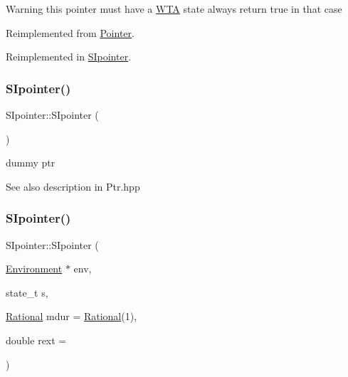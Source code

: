 \begin{DoxyWarning}{Warning}
this pointer must have a \mbox{\hyperlink{classWTA}{W\+TA}} state always return true in that case 
\end{DoxyWarning}


Reimplemented from \mbox{\hyperlink{classPointer_a51529c3e4714cafc28ba07da36078618}{Pointer}}.



Reimplemented in \mbox{\hyperlink{group__table_gac83e0619c17ce4efd589f73513706a6b}{S\+Ipointer}}.

\mbox{\label{group__table_ga7e962d8567566398e5f620ef964267cd}} 
\subsubsection{\texorpdfstring{SIpointer()}{SIpointer()}\hspace{0.1cm}{\footnotesize\ttfamily [1/6]}}
{\footnotesize\ttfamily S\+Ipointer\+::\+S\+Ipointer (\begin{DoxyParamCaption}{ }\end{DoxyParamCaption})}



dummy ptr 

\begin{DoxySeeAlso}{See also}
description in Ptr.\+hpp 
\end{DoxySeeAlso}
\mbox{\label{group__table_gac560506e7bf1439877178cf6d2459e7f}} 
\subsubsection{\texorpdfstring{SIpointer()}{SIpointer()}\hspace{0.1cm}{\footnotesize\ttfamily [2/6]}}
{\footnotesize\ttfamily S\+Ipointer\+::\+S\+Ipointer (\begin{DoxyParamCaption}\item[{\mbox{\hyperlink{classEnvironment}{Environment}} $\ast$}]{env,  }\item[{state\+\_\+t}]{s,  }\item[{\mbox{\hyperlink{classRational}{Rational}}}]{mdur = {\ttfamily \mbox{\hyperlink{classRational}{Rational}}(1)},  }\item[{double}]{rext = {} }\end{DoxyParamCaption})}



